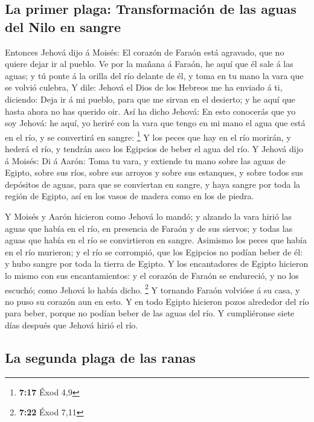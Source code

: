 \hypertarget{la-primer-plaga-transformaciuxf3n-de-las-aguas-del-nilo-en-sangre}{%
\subsection{La primer plaga: Transformación de las aguas del Nilo en
sangre}\label{la-primer-plaga-transformaciuxf3n-de-las-aguas-del-nilo-en-sangre}}

 Entonces Jehová dijo á Moisés: El corazón de Faraón está
agravado, que no quiere dejar ir al pueblo.  Ve por la
mañana á Faraón, he aquí que él sale á las aguas; y tú ponte á la orilla
del río delante de él, y toma en tu mano la vara que se volvió culebra,
 Y dile: Jehová el Dios de los Hebreos me ha enviado á ti,
diciendo: Deja ir á mi pueblo, para que me sirvan en el desierto; y he
aquí que hasta ahora no has querido oir.  Así ha dicho
Jehová: En esto conocerás que yo soy Jehová: he aquí, yo heriré con la
vara que tengo en mi mano el agua que está en el río, y se convertirá en
sangre: \footnote{\textbf{7:17} Éxod 4,9}  Y los peces que
hay en el río morirán, y hederá el río, y tendrán asco los Egipcios de
beber el agua del río.  Y Jehová dijo á Moisés: Di á Aarón:
Toma tu vara, y extiende tu mano sobre las aguas de Egipto, sobre sus
ríos, sobre sus arroyos y sobre sus estanques, y sobre todos sus
depósitos de aguas, para que se conviertan en sangre, y haya sangre por
toda la región de Egipto, así en los vasos de madera como en los de
piedra.

 Y Moisés y Aarón hicieron como Jehová lo mandó; y alzando
la vara hirió las aguas que había en el río, en presencia de Faraón y de
sus siervos; y todas las aguas que había en el río se convirtieron en
sangre.  Asimismo los peces que había en el río murieron; y
el río se corrompió, que los Egipcios no podían beber de él: y hubo
sangre por toda la tierra de Egipto.  Y los encantadores de
Egipto hicieron lo mismo con sus encantamientos: y el corazón de Faraón
se endureció, y no los escuchó; como Jehová lo había dicho. \footnote{\textbf{7:22}
  Éxod 7,11}  Y tornando Faraón volvióse á su casa, y no
puso su corazón aun en esto.  Y en todo Egipto hicieron
pozos alrededor del río para beber, porque no podían beber de las aguas
del río.  Y cumpliéronse siete días después que Jehová
hirió el río.

\hypertarget{la-segunda-plaga-de-las-ranas}{%
\subsection{La segunda plaga de las
ranas}\label{la-segunda-plaga-de-las-ranas}}

